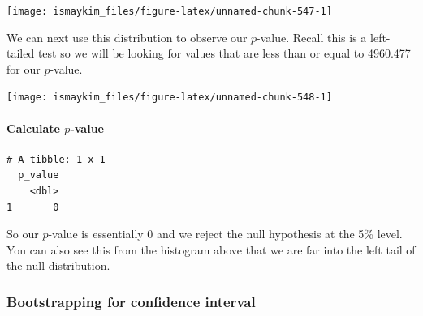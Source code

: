 \documentclass[12pt, krantz2,]{krantz}
\makeatletter
\newenvironment{Shaded}{\begin{snugshade}}{\end{snugshade}}
\newcommand{\DataTypeTok}[1]{\textcolor[rgb]{0.27,0.27,0.27}{#1}}
\newcommand{\KeywordTok}[1]{\textcolor[rgb]{0.27,0.27,0.27}{\textbf{#1}}}
\newcommand{\NormalTok}[1]{#1}
\newcommand{\OperatorTok}[1]{\textcolor[rgb]{0.43,0.43,0.43}{\textbf{#1}}}
\newcommand{\StringTok}[1]{\textcolor[rgb]{0.5,0.5,0.5}{#1}}
\let\oldparagraph\paragraph
\renewcommand{\paragraph}[1]{\oldparagraph{#1}\mbox{}}
\newenvironment{kframe}{%
\medskip{}
\setlength{\fboxsep}{.8em}
 \def\at@end@of@kframe{}%
 \ifinner\ifhmode%
  \def\at@end@of@kframe{\end{minipage}}%
  \begin{minipage}{\columnwidth}%
 \fi\fi%
 \def\FrameCommand##1{\hskip\@totalleftmargin \hskip-\fboxsep
 \colorbox{shadecolor}{##1}\hskip-\fboxsep
     \hskip-\linewidth \hskip-\@totalleftmargin \hskip\columnwidth}%
 \MakeFramed {\advance\hsize-\width
   \@totalleftmargin\z@ \linewidth\hsize
   \@setminipage}}%
 {\par\unskip\endMakeFramed%
 \at@end@of@kframe}
\renewenvironment{Shaded}{\begin{kframe}}{\end{kframe}}
\makeatother
\begin{document}
\begin{center}\texttt{[image: ismaykim\_files/figure-latex/unnamed-chunk-547-1]} \end{center}

We can next use this distribution to observe our \(p\)-value. Recall this is a left-tailed test so we will be looking for values that are less than or equal to 4960.477 for our \(p\)-value.

\begin{Shaded}
\end{Shaded}

\begin{center}\texttt{[image: ismaykim\_files/figure-latex/unnamed-chunk-548-1]} \end{center}

\hypertarget{calculate-p-value-4}{%
\paragraph{\texorpdfstring{Calculate \(p\)-value}{Calculate p-value}}\label{calculate-p-value-4}}

\begin{Shaded}
\end{Shaded}

\begin{verbatim}
# A tibble: 1 x 1
  p_value
    <dbl>
1       0
\end{verbatim}

So our \(p\)-value is essentially 0 and we reject the null hypothesis at the 5\% level. You can also see this from the histogram above that we are far into the left tail of the null distribution.

\hypertarget{bootstrapping-for-confidence-interval-4}{%
\subsubsection*{Bootstrapping for confidence interval}\label{bootstrapping-for-confidence-interval-4}}
\end{document}
